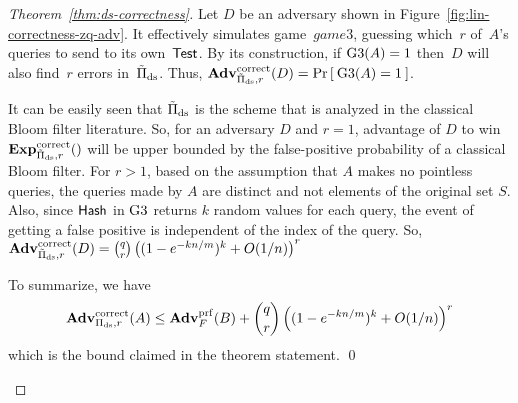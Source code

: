 \begin{proof}[Theorem~\ref{thm:ds-correctness}]
Let $D$ be an adversary shown in Figure~\ref{fig:lin-correctness-zq-adv}. It effectively simulates game~$game{3}$, guessing which~$r$ of~$A$'s queries to send to its own~$\mathsf{Test}$. By its construction, if $\text{G3}(A)=1$ then~$D$ will also find~$r$ errors in~$\tilde{\Pi}_{\mathrm{ds}}$.  Thus, $\mathrm{\mathbf{Adv}}^{\mathrm{correct}}_{\tilde{\Pi}_{\mathrm{ds}},r}(D) = \Pr\left[\: \text{G3}(A) = 1 \:\right]$.

It can be easily seen that  $\tilde{\Pi}_{\mathrm{ds}}$ is the scheme that is analyzed in the classical Bloom filter literature. So, for an adversary $D$ and $r=1$, advantage of $D$ to win $\ExpCorrect{\tilde{\setprim}_{\mathrm{ds}},r}$ will be upper bounded by the false-positive probability of a classical Bloom filter. For $r > 1$, based on the assumption that $A$ makes no pointless queries, the queries made by $A$ are distinct and not elements of the original set $S$. Also, since $\mathsf{Hash}$ in $\text{G3}$ returns $k$ random values for each query, the event of getting a false positive is independent of the index of the query. So, $\mathrm{\mathbf{Adv}}^{\mathrm{correct}}_{\tilde{\Pi}_{\mathrm{ds}},r}(D) =   {\binom{q}{r}} \left( (1-e^{-kn/m})^k + O(1/n) \right)^r$

\noindent
To summarize, we have
\[
\mathrm{\mathbf{Adv}}^{\mathrm{correct}}_{\Pi_{\mathrm{ds}},r}(A) \leq  \mathbf{Adv}^{\mathrm{prf}}_{F}(B)  + {\dbinom{q}{r}} \left( (1-e^{-kn/m})^k + O(1/n) \right)^r
\]
which is the bound claimed in the theorem statement. \hfill \qed

\begin{figure}[tp]
\end{figure}
\end{proof}
